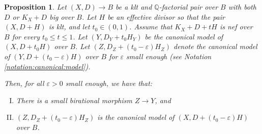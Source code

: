 \documentclass[11pt]{amsart}
\newtheorem{prop}[theorem]{Proposition}
\theoremstyle{definition}
\theoremstyle{remark}
\begin{document}
	
	
	
	
	
	\begin{prop}\label{prop:MMP:with:scaling:Jakub} Let $(X,D) \to B$ be a klt and $\mathbb{Q}$-factorial pair over $B$ with both $D$ or $K_X+D$ big over $B$. Let $H$ be an effective divisor so that the pair $(X,D+H)$ is klt, and let $t_0 \in (0,1)$. Assume that $K_X+D+tH$ is nef
		over $B$ for every $t_0 \le t \le 1$. Let $(Y,D_Y+t_0H_Y)$ be the canonical model of $(X,D+t_0H)$ over $B$. Let $(Z,D_Z+(t_0-\varepsilon)H_Z)$ denote the canonical model of $(Y,D+(t_0-\varepsilon)H)$ over $B$ for $\varepsilon$ small enough (see Notation \ref{notation:canonical:model}).
		
		Then, for all $\varepsilon > 0$ small enough, we have that:
		\begin{enumerate}[(I)]
			\item \label{itm:MMP:with:scaling:Jakub:no_divisors} There is a small birational morphism $Z \to Y$, and
			
			\item   \label{itm:MMP:with:scaling:Jakub:canonical_model_2}    $(Z,D_Z+(t_0-\varepsilon)H_Z)$ is the canonical model of $(X,D+(t_0-\varepsilon)H)$ over $B$.
		\end{enumerate}
	\end{prop}
	
\end{document}
